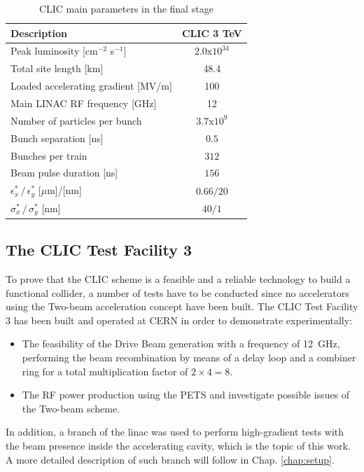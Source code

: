 \begin{table}[h]
  \centering
    \begin{tabular}{ l c  }
    \toprule
    \textbf{Description}						& \textbf{CLIC 3 TeV}	\\
    \midrule
    Peak luminosity [cm$^{-2}$ s$^{-1}$]			& $2.0\text{x}10^{34}$	\\
    Total site length [km]						& 48.4				\\
    Loaded accelerating gradient [MV/m]			& 100	\\
    Main LINAC RF frequency	[GHz]			& 12	\\
    Number of particles per bunch				& $3.7\text{x}10^{9}$ \\
    Bunch separation [ns]						& $0.5$ \\
    Bunches per train							& $312$ \\
    Beam pulse duration [ns]					& $156$ \\
    $\epsilon^*_x \, / \, \epsilon^*_y$ [$\mu$m]/[nm]	& $0.66/20$ \\  
    $\sigma^*_x\, / \, \sigma^*_y$ [nm]			& $40/1$	\\
    \bottomrule
    \end{tabular}
  \caption{CLIC main parameters in the final stage}
\label{table_CLIC_params}
\end{table}







\subsection[CTF3]{The CLIC Test Facility 3}

To prove that the CLIC scheme is a feasible and a reliable technology to build a functional collider, a number of tests have to be conducted since no accelerators using the Two-beam acceleration concept have been built. The CLIC Test Facility 3 has been built and operated at CERN in order to demonstrate experimentally:

\begin{itemize}
\item The feasibility of the Drive Beam generation with a frequency of 12~GHz, performing the beam recombination by means of  a delay loop and a combiner ring for a total multiplication factor of $2\times4 =8$.
\item The RF power production using the PETS and investigate possible issues of the Two-beam scheme.
\end{itemize}
In addition, a branch of the linac was used to perform high-gradient tests with the beam presence inside the accelerating cavity, which is the topic of this work. A more detailed description of such branch will follow in Chap. \ref{chap:setup}.
